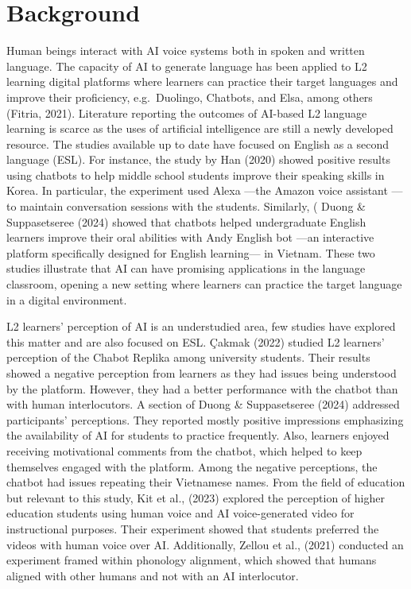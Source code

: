 \documentclass[
  a4paper,
  11pt,
  twocolumn]{article}
\begin{document}
\section{Background}

Human beings interact with AI voice systems both in spoken and written
language. The capacity of AI to generate language has been applied to L2
learning digital platforms where learners can practice their target
languages and improve their proficiency, e.g.~Duolingo, Chatbots, and
Elsa, among others \cite{fitria2021use}(Fitria, 2021). Literature
reporting the outcomes of AI-based L2 language learning is scarce as the
uses of artificial intelligence are still a newly developed resource.
The studies available up to date have focused on English as a second
language (ESL). For instance, the study by \cite{han2020effects} Han
(2020) showed positive results using chatbots to help middle school
students improve their speaking skills in Korea. In particular, the
experiment used Alexa ---the Amazon voice assistant --- to maintain
conversation sessions with the students. Similarly,
(\cite{duong2024effects} Duong \& Suppasetseree (2024) showed that
chatbots helped undergraduate English learners improve their oral
abilities with Andy English bot ---an interactive platform specifically
designed for English learning--- in Vietnam. These two studies
illustrate that AI can have promising applications in the language
classroom, opening a new setting where learners can practice the target
language in a digital environment.

L2 learners' perception of AI is an understudied area, few studies have
explored this matter and are also focused on ESL.
\cite{ccakmak2022chatbot}Çakmak (2022) studied L2 learners' perception
of the Chabot Replika among university students. Their results showed a
negative perception from learners as they had issues being understood by
the platform. However, they had a better performance with the chatbot
than with human interlocutors. A section of \cite{duong2024effects}
Duong \& Suppasetseree (2024) addressed participants' perceptions. They
reported mostly positive impressions emphasizing the availability of AI
for students to practice frequently. Also, learners enjoyed receiving
motivational comments from the chatbot, which helped to keep themselves
engaged with the platform. Among the negative perceptions, the chatbot
had issues repeating their Vietnamese names. From the field of education
but relevant to this study, \cite{kit2023perception} Kit et al., (2023)
explored the perception of higher education students using human voice
and AI voice-generated video for instructional purposes. Their
experiment showed that students preferred the videos with human voice
over AI. Additionally, \cite{zellou2021influence} Zellou et al., (2021)
conducted an experiment framed within phonology alignment, which showed
that humans aligned with other humans and not with an AI interlocutor.
\end{document}
